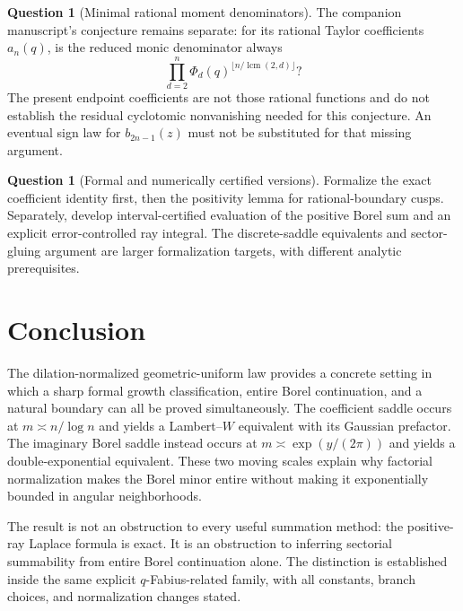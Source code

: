 \documentclass[11pt,a4paper]{article}
\numberwithin{equation}{section}
\theoremstyle{definition}
\newtheorem{question}[theorem]{Question}
\theoremstyle{remark}
\DeclareMathOperator{\lcm}{lcm}
\begin{document}
\begin{question}[Minimal rational moment denominators]
The companion manuscript's conjecture remains separate: for its rational Taylor coefficients $a_n(q)$, is the reduced monic denominator always
\[
 \prod_{d=2}^{n}\Phi_d(q)^{\lfloor n/\lcm(2,d)\rfloor}?
\]
The present endpoint coefficients are not those rational functions and do not establish the residual cyclotomic nonvanishing needed for this conjecture. An eventual sign law for $b_{2n-1}(z)$ must not be substituted for that missing argument.
\end{question}

\begin{question}[Formal and numerically certified versions]
Formalize the exact coefficient identity first, then the positivity lemma for rational-boundary cusps. Separately, develop interval-certified evaluation of the positive Borel sum and an explicit error-controlled ray integral. The discrete-saddle equivalents and sector-gluing argument are larger formalization targets, with different analytic prerequisites.
\end{question}

\section{Conclusion}
The dilation-normalized geometric-uniform law provides a concrete setting in which a sharp formal growth classification, entire Borel continuation, and a natural boundary can all be proved simultaneously. The coefficient saddle occurs at $m\asymp n/\log n$ and yields a Lambert--$W$ equivalent with its Gaussian prefactor. The imaginary Borel saddle instead occurs at $m\asymp\exp(y/(2\pi))$ and yields a double-exponential equivalent. These two moving scales explain why factorial normalization makes the Borel minor entire without making it exponentially bounded in angular neighborhoods.

The result is not an obstruction to every useful summation method: the positive-ray Laplace formula is exact. It is an obstruction to inferring sectorial summability from entire Borel continuation alone. The distinction is established inside the same explicit $q$-Fabius-related family, with all constants, branch choices, and normalization changes stated.

\appendix
{}
\end{document}
